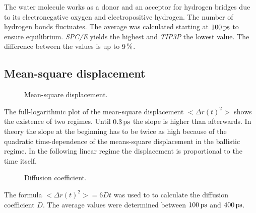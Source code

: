 \documentclass[12pt,a4paper]{scrartcl}
\begin{document}
The water molecule works as a donor and an acceptor for hydrogen bridges due to its electronegative oxygen and electropositive hydrogen. The number of hydrogen bonds fluctuates. The average was calculated starting at $\unit[100]{ps}$ to ensure equilibrium. \textit{SPC/E} yields the highest and \textit{TIP3P} the lowest value. The difference between the values is up to $\unit[9]{\%}$.

\subsection{Mean-square displacement}
\begin{figure}[H]
	\resizebox{\linewidth}{!}{}
    \caption{Mean-square displacement.} \label{fig:msd}
\end{figure}

The full-logarithmic plot of the mean-square displacement $< \Delta r(t)^2 >$ shows the existence of two regimes. Until $\unit[0.3]{ps}$ the slope is higher than afterwards. In theory the slope at the beginning has to be twice as high because of the quadratic time-dependence of the means-square displacement in the ballistic regime. In the following linear regime the displacement is proportional to the time itself.

\begin{figure}[H]
	\resizebox{\linewidth}{!}{}
    \caption{Diffusion coefficient.} \label{fig:diffusion}
\end{figure}

The formula $< \Delta r(t)^2 > = 6 D t$ was used to to calculate the diffusion coefficient $D$. The average values were determined between $\unit[100]{ps}$ and $\unit[400]{ps}$.
\end{document}
